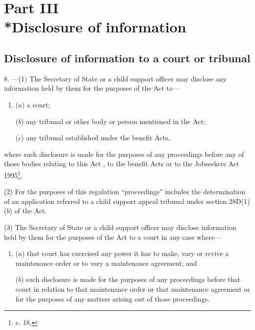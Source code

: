 \documentclass[a4paper,12pt]{article}
\begin{document}
\section[Part III --- Disclosure of information]{Part III\\*Disclosure of information}

\renewcommand\parthead{--- Part III}

\subsection[8. Disclosure of information to a court or tribunal]{Disclosure of information to a court or tribunal}

8.%
---(1)  %
  The Secretary of State or a child support officer may disclose any information held by them for the purposes of the Act to—
\begin{enumerate}\item[]
($a$) a court;

($b$) any tribunal or other body or person mentioned in the Act;

($c$) any tribunal established under the benefit Acts,
\end{enumerate}
where such disclosure is made for the purposes of any proceedings before any of those bodies relating to this Act%
, to the benefit Acts or to the Jobseekers Act 1995\footnote{ c. 18.}.  %

(2) For the purposes of this regulation “proceedings” includes the determination of an application referred to a child support appeal tribunal under section 28D(1)($b$) of the Act.

(3) The Secretary of State or a child support officer may disclose information held by them for the purposes of the Act to a court in any case where—
\begin{enumerate}\item[]
($a$) that court has exercised any power it has to make, vary or revive a maintenance order or to vary a maintenance agreement; and

($b$) such disclosure is made for the purposes of any proceedings before that court in relation to that maintenance order or that maintenance agreement or for the purposes of any matters arising out of those proceedings.
\end{enumerate}
\end{document}
